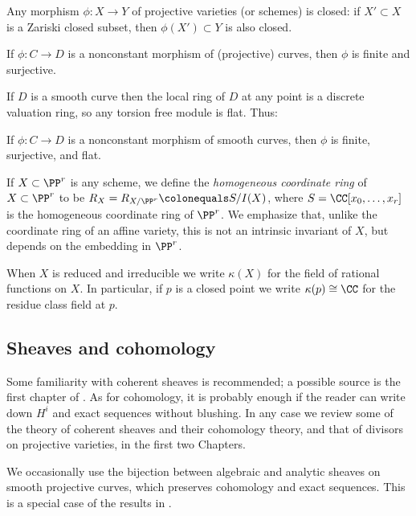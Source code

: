 \begin{theorem}
 Any morphism $\phi: X\to Y$ of projective varieties (or schemes) is closed: if $X'\subset X$ is a Zariski closed subset,
 then $\phi(X') \subset Y$ is also closed.
%
%
\end{theorem}

\begin{corollary}
If $\phi: C\to D$ is a nonconstant morphism of (projective) curves, then $\phi$ is finite and surjective. 
\end{corollary}

If $D$ is a 
smooth curve then the local ring of $D$ at any point is a discrete valuation ring, so any torsion free module is flat. 
Thus:

\begin{proposition}
If $\phi: C\to D$ is a nonconstant morphism of smooth curves, then $\phi$ is finite, surjective, and flat.
\end{proposition}

If $X\subset \PP^{r}$ is any scheme, we define the 
\emph{homogeneous coordinate ring}
%
of $X\subset \PP^{r}$
to be $R_{X} = R_{X/\PP^{r}}\colonequals S/I(X)$, where $S =\CC[x_{0}, \dots, x_{r}]$ is the homogeneous coordinate ring of $\PP^{r}$. We emphasize
that, unlike the coordinate ring of an affine variety, this is not an intrinsic invariant of $X$, but depends on the 
embedding in $\PP^{r}$. 

When $X$ is reduced and irreducible we write $\kappa(X)$ for the field of rational functions on $X$. In particular, if
$p$ is a closed point  we write $\kappa(p)\cong \CC$ for the residue class field at $p$.

\subsection*{Sheaves and cohomology} 

Some familiarity with coherent sheaves is recommended; a possible source is
the first chapter of 
\cite{GeomSchemes}. 
As for cohomology, it is probably enough if the reader can write down $H^i$ and exact sequences without blushing.
In any case we review some of the theory of coherent sheaves and their cohomology theory, and that of divisors on projective 
varieties, in the first two Chapters. 

We occasionally use the bijection between algebraic and analytic sheaves on smooth projective curves, which preserves
cohomology and exact sequences. This is a special case of the results in \cite{GAGA}. 


